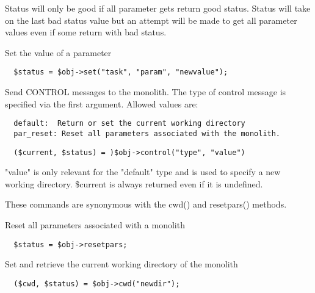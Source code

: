 \begin{description}
\begin{description}
\begin{description}
Status will only be good if all parameter gets return good
status. Status will take on the last bad status value but
an attempt will be made to get all parameter values even if
some return with bad status.


\item[{\textbf{set}}] \mbox{}

Set the value of a parameter

\begin{verbatim}
  $status = $obj->set("task", "param", "newvalue");
\end{verbatim}

\item[{\textbf{control}}] \mbox{}

Send CONTROL messages to the monolith. The type of control
message is specified via the first argument. Allowed values are:

\begin{verbatim}
  default:  Return or set the current working directory
  par_reset: Reset all parameters associated with the monolith.
\end{verbatim}
\begin{verbatim}
  ($current, $status) = )$obj->control("type", "value")
\end{verbatim}


"value" is only relevant for the "default" type and is used
to specify a new working directory. \$current is always returned
even if it is undefined.



These commands are synonymous with the cwd() and resetpars()
methods.


\item[{\textbf{resetpars}}] \mbox{}

Reset all parameters associated with a monolith

\begin{verbatim}
  $status = $obj->resetpars;
\end{verbatim}

\item[{\textbf{cwd}}] \mbox{}

Set and retrieve the current working directory of the monolith

\begin{verbatim}
  ($cwd, $status) = $obj->cwd("newdir");
\end{verbatim}

\item[{\textbf{contactw}}] \mbox{}


\end{description}
\end{description}
\end{description}
